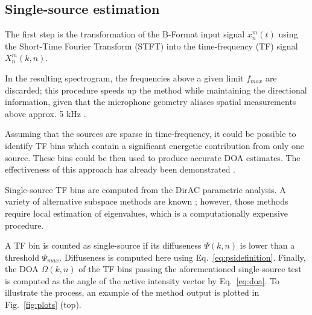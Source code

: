 \subsection{Single-source estimation}

The first step is the transformation of the B-Format input signal $x_n^m(t)$ using the Short-Time Fourier Transform (STFT) into the time-frequency (TF) signal $X_n^m(k,n)$.

In the resulting spectrogram, the frequencies above a given limit $f_{max}$ are discarded; this procedure speeds up the method while maintaining the directional information, given that the microphone geometry aliases spatial measurements above approx. 5 kHz \cite{Bertet2006}.

Assuming that the sources are sparse in time-frequency, it could be possible to identify TF bins which contain a significant energetic contribution from only one source.
These bins could be then used to produce accurate DOA estimates. The effectiveness of this approach has already been demonstrated \cite{tho2014robust, nguyen2020sequence}.

Single-source TF bins are computed from the DirAC parametric analysis.
A variety of alternative subspace methods are known \cite{epain2016spherical, madmoni2018direction}; however, those methods require local estimation of eigenvalues, which is a computationally expensive procedure. 

A TF bin is counted as single-source if its diffuseness $\Psi(k,n)$ is lower than a threshold $\Psi_{max}$. Diffuseness is computed here using Eq.~\ref{eq:psidefinition}. 
 Finally, the DOA $\Omega(k,n)$ of the TF bins passing the aforementioned single-source test is computed as the angle of the active intensity vector by Eq.~\ref{eq:doa}.
 To illustrate the process, an example of the method output is plotted in Fig.~\ref{fig:plots} (top).

